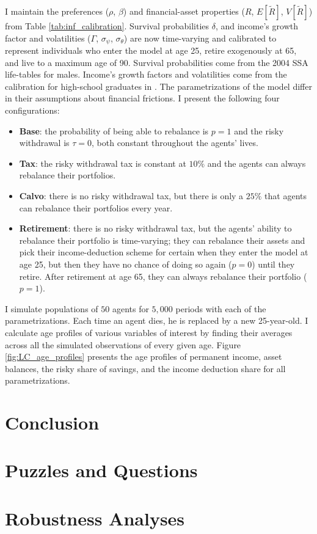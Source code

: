 \documentclass[./RiskyContrib.tex]{subfiles}
\begin{document}
I maintain the preferences ($\rho$, $\beta$) and financial-asset properties
($R$, $E[\tilde{R}]$, $V[\tilde{R}]$) from Table \ref{tab:inf_calibration}.
Survival probabilities $\delta$, and income's growth factor and volatilities
($\Gamma$, $\sigma_{\psi}$, $\sigma_{\theta}$) are now time-varying and
calibrated to represent  individuals who enter the model at age 25,
retire exogenously at 65, and live to a maximum age of 90. Survival
probabilities come from the 2004 SSA life-tables for males. Income's growth
factors and volatilities come from the calibration for high-school graduates
in \cite{Cagetti2003jbes}. The parametrizations of the model differ in their
assumptions about financial frictions. I present the following four configurations:
\begin{itemize}
\item \textbf{Base}: the probability of being able to rebalance is $p = 1$
and the risky withdrawal is $\tau = 0$, both constant throughout the agents' lives.
\item \textbf{Tax}: the risky withdrawal tax is constant at $10\%$ and the agents
can always rebalance their portfolios.
\item \textbf{Calvo}: there is no risky withdrawal tax, but there is only a $25\%$
that agents can rebalance their portfolios every year.
\item \textbf{Retirement}: there is no risky withdrawal tax, but the agents' ability
to rebalance their portfolio is time-varying; they can rebalance their assets and pick
their income-deduction scheme for certain when they enter the model at age 25, but
then they have no chance of doing so again ($p=0$) until they retire. After retirement
at age 65, they can always rebalance their portfolio ($p=1$).
\end{itemize}




I simulate populations of $50$ agents for $5,000$ periods with each of the
parametrizations. Each time an agent dies, he is replaced by a new 25-year-old.
I calculate age profiles of various variables of interest by finding their
averages across all the simulated observations of every given age. Figure 
\ref{fig:LC_age_profiles} presents the age profiles of permanent income,
asset balances, the risky share of savings, and the income deduction share
for all parametrizations.

\hypertarget{Conclusion}{}
\section{Conclusion}

\hypertarget{Puzzles-and-Questions}{}
\section{Puzzles and Questions}\label{sec:Puzzles}

\hypertarget{Robustness Analyses}{}
\section{Robustness Analyses}

\clearpage\vfill\eject

\onlyinsubfile{}
\end{document}
